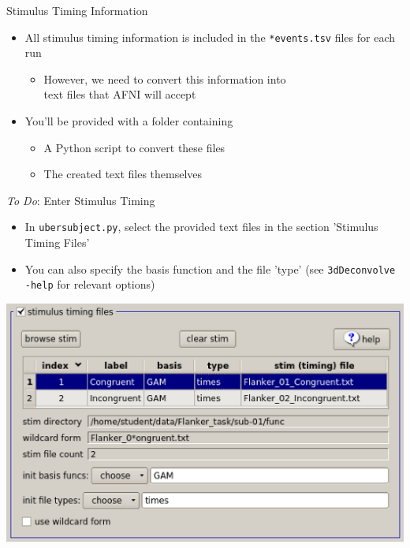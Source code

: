 \documentclass[t,12pt]{beamer}
\begin{document}
\begin{frame}{Stimulus Timing Information}
\vspace{10pt}
\begin{itemize}
\setlength\itemsep{1em}
\item All stimulus timing information is included in the \texttt{*events.tsv} files for each run
\vspace{4pt}
\begin{itemize}
\item However, we need to convert this information into \\ text files that AFNI will accept
\end{itemize}
\item You'll be provided with a folder containing 
\vspace{4pt}
\begin{itemize}
\setlength\itemsep{0.5em}
\item A Python script to convert these files
\item The created text files themselves
\end{itemize}
\end{itemize}
\end{frame}

\begin{frame}{\emph{To Do}: Enter Stimulus Timing}
\vspace{10pt}
\begin{itemize}
\setlength\itemsep{1em}
\item In \texttt{uber\textunderscore{}subject.py}, select the provided text files in the section 'Stimulus Timing Files'
\item You can also specify the basis function and the file 'type' (see \texttt{3dDeconvolve -help} for relevant options)
\end{itemize}
\vspace{6pt}
\centering
\includegraphics[width=.65\textwidth]{images/stimTime_spec.png}
\end{frame}
\end{document}
